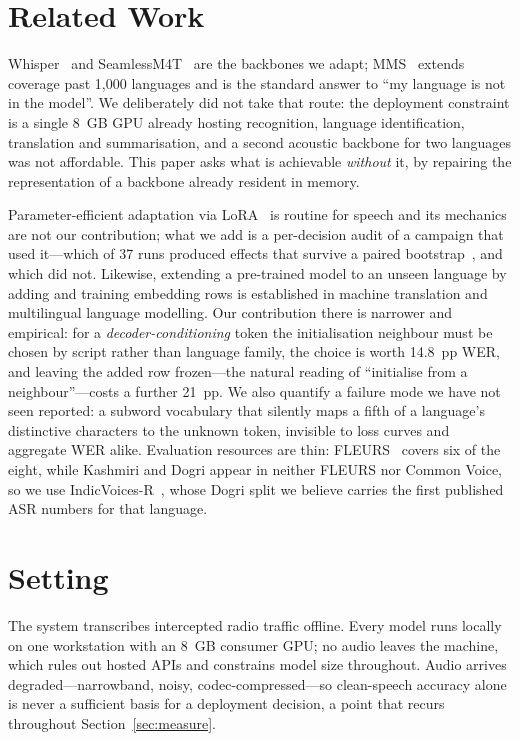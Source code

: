 \documentclass[sigconf,anonymous,review]{acmart}
\begin{document}
\section{Related Work}
\label{sec:related}

Whisper~\cite{whisper} and SeamlessM4T~\cite{seamless} are the backbones we
adapt; MMS~\cite{mms} extends coverage past 1{,}000 languages and is the
standard answer to ``my language is not in the model''. We deliberately did not
take that route: the deployment constraint is a single 8~GB GPU already hosting
recognition, language identification, translation and summarisation, and a
second acoustic backbone for two languages was not affordable. This paper asks
what is achievable \emph{without} it, by repairing the representation of a
backbone already resident in memory.

Parameter-efficient adaptation via LoRA~\cite{lora} is routine for speech and
its mechanics are not our contribution; what we add is a per-decision audit of a
campaign that used it---which of 37 runs produced effects that survive a paired
bootstrap~\cite{bootstrap}, and which did not. Likewise, extending a pre-trained
model to an unseen language by adding and training embedding rows is established
in machine translation and multilingual language modelling. Our contribution
there is narrower and empirical: for a \emph{decoder-conditioning} token the
initialisation neighbour must be chosen by script rather than language family,
the choice is worth 14.8~pp WER, and leaving the added row frozen---the natural
reading of ``initialise from a neighbour''---costs a further 21~pp. We also
quantify a failure mode we have not seen reported: a subword vocabulary that
silently maps a fifth of a language's distinctive characters to the unknown
token, invisible to loss curves and aggregate WER alike. Evaluation resources
are thin: FLEURS~\cite{fleurs} covers six of the eight, while Kashmiri and Dogri
appear in neither FLEURS nor Common Voice, so we use
IndicVoices-R~\cite{indicvoices}, whose Dogri split we believe carries the first
published ASR numbers for that language.

\section{Setting}
\label{sec:setting}

The system transcribes intercepted radio traffic offline. Every model runs
locally on one workstation with an 8~GB consumer GPU; no audio leaves the
machine, which rules out hosted APIs and constrains model size throughout. Audio
arrives degraded---narrowband, noisy, codec-compressed---so clean-speech
accuracy alone is never a sufficient basis for a deployment decision, a point
that recurs throughout Section~\ref{sec:measure}.
\end{document}
